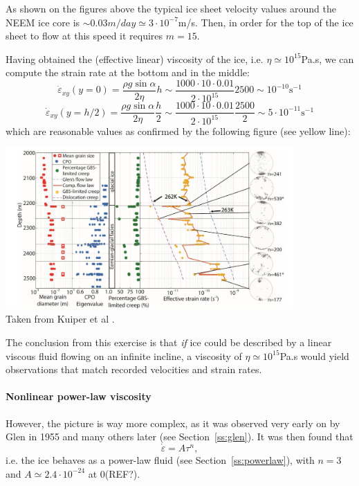 As shown on the figures above the typical ice sheet velocity values around the NEEM ice core 
is $\sim 0.03m/day \simeq 3\cdot 10^{-7}$m/s. 
Then, in order for the top of the ice sheet to flow at this speed it requires $m=15$.

Having obtained the (effective linear) viscosity of the ice, i.e. $\eta\simeq 10^{15}$Pa.s,
we can compute the strain rate at the bottom and in the middle:
\[
\dot{\varepsilon}_{xy}(y=0) 
= \frac{\rho g \sin \alpha}{2 \eta} h
\sim \frac{1000\cdot 10 \cdot 0.01}{2 \cdot 10^{15}}2500
\sim 10^{-10}\text{s}^{-1}
\]
\[
\dot{\varepsilon}_{xy}(y=h/2) 
= \frac{\rho g \sin \alpha}{2 \eta} \frac{h}{2}
\sim \frac{1000\cdot 10 \cdot 0.01}{2 \cdot 10^{15}}\frac{2500}{2}
\sim 5\cdot 10^{-11}\text{s}^{-1}
\]
which are reasonable values as confirmed by the following figure (see yellow line):  
\begin{center}
\includegraphics[width=11cm]{python_codes/fieldstone_59/images/kudd19}\\
{\captionfont Taken from Kuiper et al \cite{kudd19}.}
\end{center}

The conclusion from this exercise is that {\sl if} ice could be described by 
a linear viscous fluid flowing on an infinite incline, a viscosity of $\eta\simeq 10^{15}$Pa.s
would yield observations that match recorded velocities and strain rates. 


\paragraph{Nonlinear power-law viscosity}
However, the picture is way more complex, as it was observed very early on 
by Glen in 1955 \cite{glen55} and many others later (see Section~\ref{ss:glen}). 
It was then found that 
\[
\dot{\varepsilon} = A \tau^n,
\]
i.e. the ice behaves as a power-law fluid (see Section~\ref{ss:powerlaw}), with 
$n=3$ and $A\simeq 2.4\cdot 10^{-24}$ at 0\degree (REF?).


